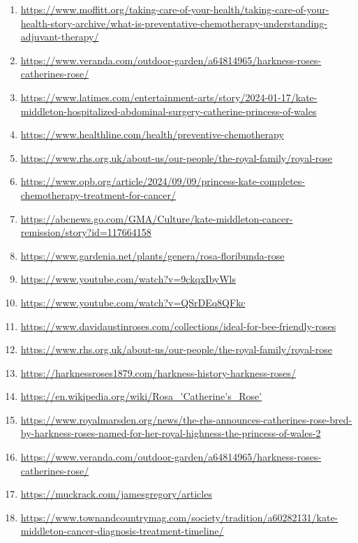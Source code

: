 \documentclass[10pt,a4paper]{article}
\begin{document}
\begin{enumerate}[leftmargin=*]
            \item \url{ https://www.moffitt.org/taking-care-of-your-health/taking-care-of-your-health-story-archive/what-is-preventative-chemotherapy-understanding-adjuvant-therapy/ }
            \item \url{ https://www.veranda.com/outdoor-garden/a64814965/harkness-roses-catherines-rose/ }
            \item \url{ https://www.latimes.com/entertainment-arts/story/2024-01-17/kate-middleton-hospitalized-abdominal-surgery-catherine-princess-of-wales }
            \item \url{ https://www.healthline.com/health/preventive-chemotherapy }
            \item \url{ https://www.rhs.org.uk/about-us/our-people/the-royal-family/royal-rose }
            \item \url{ https://www.opb.org/article/2024/09/09/princess-kate-completes-chemotherapy-treatment-for-cancer/ }
            \item \url{ https://abcnews.go.com/GMA/Culture/kate-middleton-cancer-remission/story?id=117664158 }
            \item \url{ https://www.gardenia.net/plants/genera/rosa-floribunda-rose }
            \item \url{ https://www.youtube.com/watch?v=9ckqxIbyWls }
            \item \url{ https://www.youtube.com/watch?v=QSrDEq8QFkc }
            \item \url{ https://www.davidaustinroses.com/collections/ideal-for-bee-friendly-roses }
            \item \url{ https://www.rhs.org.uk/about-us/our-people/the-royal-family/royal-rose }
            \item \url{ https://harknessroses1879.com/harkness-history-harkness-roses/ }
            \item \url{ https://en.wikipedia.org/wiki/Rosa\_'Catherine's\_Rose' }
            \item \url{ https://www.royalmarsden.org/news/the-rhs-announces-catherines-rose-bred-by-harkness-roses-named-for-her-royal-highness-the-princess-of-wales-2 }
            \item \url{ https://www.veranda.com/outdoor-garden/a64814965/harkness-roses-catherines-rose/ }
            \item \url{ https://muckrack.com/jamesgregory/articles }
            \item \url{ https://www.townandcountrymag.com/society/tradition/a60282131/kate-middleton-cancer-diagnosis-treatment-timeline/ }

\end{enumerate}
\end{document}
